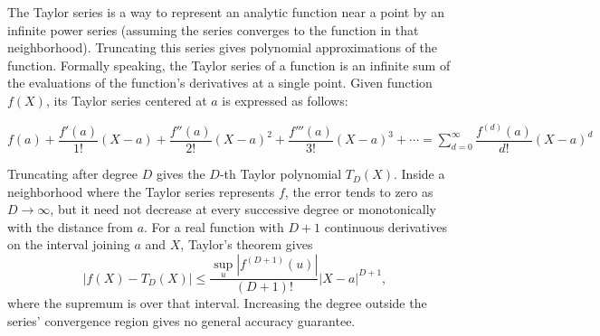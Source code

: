 The Taylor series is a way to represent an analytic function near a point by an infinite power series (assuming the series converges to the function in that neighborhood). Truncating this series gives polynomial approximations of the function. Formally speaking, the Taylor series of a function is an infinite sum of the evaluations of the function's derivatives at a single point. Given function $f(X)$, its Taylor series centered at $a$ is expressed as follows:

$
f(a) + \dfrac{f'(a)}{1!}(X - a) + \dfrac{f''(a)}{2!}(X - a)^2 + \dfrac{f'''(a)}{3!}(X - a)^3 + \cdots = \sum\limits_{d=0}^{\infty}\dfrac{f^{(d)}(a)}{d!}(X - a)^d
$

Truncating after degree $D$ gives the $D$-th Taylor polynomial $T_D(X)$. Inside a neighborhood where the Taylor series represents $f$, the error tends to zero as $D\to\infty$, but it need not decrease at every successive degree or monotonically with the distance from $a$. For a real function with $D+1$ continuous derivatives on the interval joining $a$ and $X$, Taylor's theorem gives
\[
|f(X)-T_D(X)|\le\frac{\sup_{u}|f^{(D+1)}(u)|}{(D+1)!}|X-a|^{D+1},
\]
where the supremum is over that interval. Increasing the degree outside the series' convergence region gives no general accuracy guarantee.